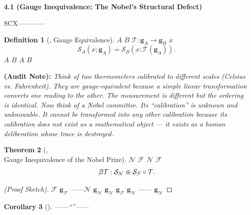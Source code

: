 \documentclass[12pt,a4paper]{article}
\newtheorem{theorem}{Theorem}[section]
\newtheorem{corollary}[theorem]{Corollary}
\newtheorem{definition}[theorem]{Definition}
\theoremstyle{remark}
\newcommand{\gaugeVec}{\mathbf{g}}
\newcommand{\scoreOp}{\mathcal{S}}
\newcommand{\auditnote}[1]{%
    \medskip\noindent
    \textbf{ (Audit Note):} \textit{#1}%
}
\begin{document}
\subsection{}

\noindent
\textbf{4.1  (Gauge Inequivalence: The Nobel's Structural Defect)}

SCX————\textbf{}

\begin{definition}[, Gauge Equivalence]
\label{def:gauge_equivalence}
 $A$  $B$ \textbf{} $\mathcal{T}: \gaugeVec_A \to \gaugeVec_B$ $x$
\begin{equation}
    \scoreOp_A(x; \gaugeVec_A) = \scoreOp_B(x; \mathcal{T}(\gaugeVec_A)).
    \label{eq:gauge_equiv}
\end{equation}
 $A$  $B$  $A$  $B$ \textit{}
\end{definition}

\auditnote{Think of two thermometers calibrated to different scales (Celsius vs. Fahrenheit). They are gauge-equivalent because a simple linear transformation converts one reading to the other. The measurement is different but the \textit{ordering} is identical. Now think of a Nobel committee. Its ``calibration'' is unknown and unknowable. It cannot be transformed into any other calibration because its calibration does not exist as a mathematical object — it exists as a human deliberation whose trace is destroyed.}

\begin{theorem}[, \\
    Gauge Inequivalence of the Nobel Prize]
\label{thm:nobel_gauge}
 $\mathcal{N}$ $\mathcal{F}$  $\mathcal{N}$  $\mathcal{F}$ 
\begin{equation}
    \not\exists \mathcal{T}: \scoreOp_{\mathcal{N}} \equiv \scoreOp_{\mathcal{F}} \circ \mathcal{T}.
    \label{eq:nobel_gauge}
\end{equation}
\end{theorem}

\begin{proof}[ (Proof Sketch)]
$\mathcal{F}$  $\gaugeVec_{\mathcal{F}}$ ——$\mathcal{N}$  $\gaugeVec_{\mathcal{N}}$ \textbf{} $\gaugeVec_{\mathcal{N}}$ $\gaugeVec_{\mathcal{F}}$ $\gaugeVec_{\mathcal{N}}$ —— $\gaugeVec_{\mathcal{N}}$ 
\end{proof}

\begin{corollary}[]
\label{cor:nobel_nontransitive}
——``''——\textbf{}
\end{corollary}
\end{document}
